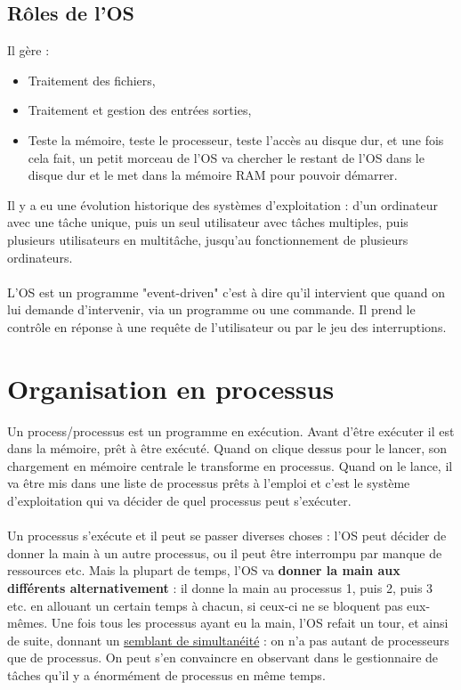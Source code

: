 \documentclass[12pt,a4paper]{report}
\begin{document}
\subsection{Rôles de l'OS}
Il gère :
\begin{itemize}
\item Traitement des fichiers,
\item Traitement et gestion des entrées sorties,
\item Teste la mémoire, teste le processeur, teste l'accès au disque dur, et une fois cela fait, un  petit morceau de l'OS va chercher le restant de l'OS dans le disque dur et le met dans la mémoire RAM pour pouvoir démarrer.
\end{itemize}
Il y a eu une évolution historique des systèmes d'exploitation : d'un ordinateur avec une tâche unique, puis un seul utilisateur  avec tâches multiples, puis plusieurs utilisateurs en multitâche, jusqu'au fonctionnement de plusieurs ordinateurs.\\
\\
L'OS est un programme "event-driven" c'est à dire qu'il intervient que quand on lui demande d'intervenir, via un programme ou une commande. Il prend le contrôle en réponse à une requête de l'utilisateur ou par le jeu des interruptions.
\section{Organisation en processus} \label{section:processus}
Un process/processus est un programme en exécution. Avant d'être exécuter il est dans la mémoire, prêt à être exécuté. Quand on clique dessus pour le lancer, son chargement en mémoire centrale le transforme en processus. Quand on le lance, il va être mis dans une liste de processus prêts à l'emploi et c'est le système d'exploitation qui va décider de quel processus peut s'exécuter. \\
\\
Un processus s'exécute et il peut se passer diverses choses : l'OS peut décider de donner la main à un autre processus, ou il peut être interrompu par manque de ressources etc. Mais la plupart de temps, l'OS va \textbf{donner la main aux différents alternativement} : il donne la main au processus 1, puis 2, puis 3 etc. en allouant un certain temps à chacun, si ceux-ci ne se bloquent pas eux-mêmes. Une fois tous les processus ayant eu la main, l'OS refait un tour, et ainsi de suite, donnant un \underline{semblant de simultanéité} : on n'a pas autant de processeurs que de processus. On peut s'en convaincre en observant dans le gestionnaire de tâches qu'il y a énormément de processus en même temps.
\end{document}
